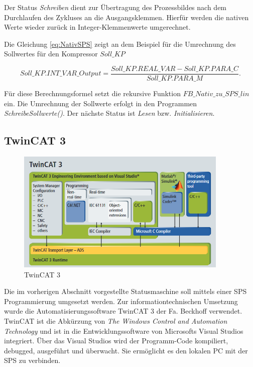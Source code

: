 Der Status \textit{Schreiben} dient zur Übertragung des Prozessbildes  nach dem Durchlaufen des Zykluses an die Ausgangsklemmen. Hierfür werden die nativen Werte wieder zurück in Integer-Klemmenwerte umgerechnet.

Die Gleichung \ref{eq:NativSPS} zeigt an dem Beispiel für die Umrechnung des Sollwertes für den Kompressor $Soll\_KP$

\begin{equation}
Soll\_KP.INT\_VAR\_Output = \frac{Soll\_KP.REAL\_VAR - Soll\_KP.PARA\_C}{Soll\_KP.PARA\_M}.
\label{eq:NativSPS} 
\end{equation}

Für diese Berechnungsformel setzt \textsc{\citeauthor{Nuerenberg2015}} die rekursive Funktion $FB\_Nativ\_zu\_SPS\_lin$ ein. Die Umrechnung der Sollwerte erfolgt in den Programmen \textit{SchreibeSollwerte()}. Der nächste Status ist \textit{Lesen} bzw. \textit{Initialisieren}.

\subsection{TwinCAT 3}
\label{subsec:TwinCat}

\begin{figure}[htb]
\centering		\includegraphics[width=0.90\textwidth]{Pictures/TwinCat3_Beckhoff.png}
\caption{TwinCAT 3 \citep{Beckhoff2016}}
\label{fig:TwinCAT}
\end{figure}


Die im vorherigen Abschnitt vorgestellte Statusmaschine soll mittels einer SPS Programmierung umgesetzt werden. Zur informationtechnischen Umsetzung wurde die Automatisierungssoftware TwinCAT 3 der Fa. Beckhoff verwendet. TwinCAT ist die Abkürzung von \textit{The Windows Control and Automation Technology} und  ist in die Entwicklungssoftware von Microsofts Visual Studios integriert. Über das Visual Studios wird der Programm-Code kompiliert, debugged, ausgeführt und überwacht. Sie ermöglicht es den lokalen PC mit der SPS zu verbinden. 

